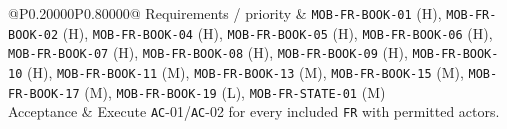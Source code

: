 \begin{longtable}{@{}P{0.20000\SRSWidth}P{0.80000\SRSWidth}@{}}
Requirements /\allowbreak{} priority & \texttt{MOB-\allowbreak{}FR-\allowbreak{}BOOK-\allowbreak{}01} (H), \texttt{MOB-\allowbreak{}FR-\allowbreak{}BOOK-\allowbreak{}02} (H), \texttt{MOB-\allowbreak{}FR-\allowbreak{}BOOK-\allowbreak{}04} (H), \texttt{MOB-\allowbreak{}FR-\allowbreak{}BOOK-\allowbreak{}05} (H), \texttt{MOB-\allowbreak{}FR-\allowbreak{}BOOK-\allowbreak{}06} (H), \texttt{MOB-\allowbreak{}FR-\allowbreak{}BOOK-\allowbreak{}07} (H), \texttt{MOB-\allowbreak{}FR-\allowbreak{}BOOK-\allowbreak{}08} (H), \texttt{MOB-\allowbreak{}FR-\allowbreak{}BOOK-\allowbreak{}09} (H), \texttt{MOB-\allowbreak{}FR-\allowbreak{}BOOK-\allowbreak{}10} (H), \texttt{MOB-\allowbreak{}FR-\allowbreak{}BOOK-\allowbreak{}11} (M), \texttt{MOB-\allowbreak{}FR-\allowbreak{}BOOK-\allowbreak{}13} (M), \texttt{MOB-\allowbreak{}FR-\allowbreak{}BOOK-\allowbreak{}15} (M), \texttt{MOB-\allowbreak{}FR-\allowbreak{}BOOK-\allowbreak{}17} (M), \texttt{MOB-\allowbreak{}FR-\allowbreak{}BOOK-\allowbreak{}19} (L), \texttt{MOB-\allowbreak{}FR-\allowbreak{}STATE-\allowbreak{}01} (M) \\[3pt]
Acceptance & Execute \texttt{AC}-01/\allowbreak{}\texttt{AC}-02 for every included \texttt{FR} with permitted actors. \\[3pt]
\end{longtable}
\endgroup

